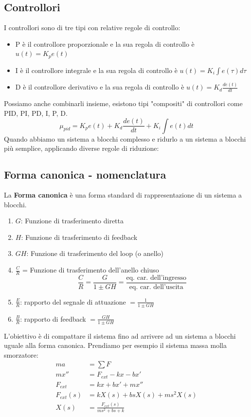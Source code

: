 \documentclass[a4paper]{article}
\begin{document}
\subsection{Controllori}
I controllori sono di tre tipi con relative regole di controllo:
\begin{itemize}
    \item P è il controllore proporzionale e la sua regola di controllo è $u(t) = K_p e(t)$
    \item I è il controllore integrale e la sua regola di controllo è $u(t) = K_i \int e(\tau)d\tau$
    \item D è il controllore derivativo e la sua regola di controllo è $u(t) = K_d \frac{de(t)}{dt}$
\end{itemize}
Possiamo anche combinarli insieme, esistono tipi "compositi" di controllori come PID, PI, PD, I, P, D.
\[\mu_{pid} = K_p e(t) + K_d \frac{de(t)}{dt} + K_i \int e(t)dt\]
Quando abbiamo un sistema a blocchi complesso e ridurlo a un sistema a blocchi più semplice, applicando diverse regole di riduzione:
\subsection{Forma canonica - nomenclatura}
La \textbf{Forma canonica} è una forma standard di rappresentazione di un sistema a blocchi.
\begin{enumerate}
    \item $G$: Funzione di trasferimento diretta
    \item $H$: Funzione di trasferimento di feedback
    \item $GH$: Funzione di trasferimento del loop (o anello)
    \item $\frac{C}{R}$ = Funzione di trasferimento dell'anello chiuso 
    \[\frac{C}{R} = \frac{G}{1 \pm GH} = \frac{\text{eq. car. dell'ingresso}}{\text{eq. car. dell'uscita}}\]
    \item $\frac{E}{R}$: rapporto del segnale di attuazione $ = \frac{1}{1 \pm GH}$
    \item $\frac{B}{R}$: rapporto di feedback $ = \frac{GH}{1 \pm GH}$ 
\end{enumerate}
L'obiettivo è di compattare il sistema fino ad arrivere ad un sistema a blocchi uguale alla forma canonica.
Prendiamo per esempio il sistema massa molla smorzatore:
\begin{align*}
    ma &= \sum F\\
    mx'' &=  F_{ext} - kx - bx'\\
    F_{ext} &= kx + bx' + mx''\\
    F_{ext}(s) &= kX(s) + bsX(s) + ms^2X(s)\\
    X(s) &= \frac{F_{ext}(s)}{ms^2 + bs + k}
\end{align*}
\end{document}
